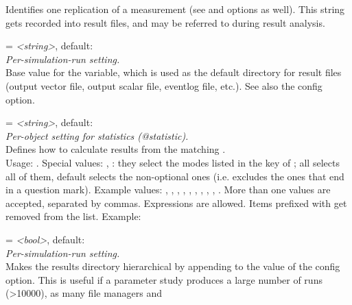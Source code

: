 \begin{description}
    Identifies one replication of a measurement (see  and
     options as well). This string gets
    recorded into result files, and may be referred to during result analysis.
\item[result-dir] = \textit{<string>}, default: \\
    \textit{Per-simulation-run setting.}\\
    Base value for the 
    variable, which is used as the default directory for result files (output
    vector file, output scalar file, eventlog file, etc.). See also the
     config option.
\item[**.result-recording-modes] = \textit{<string>}, default: \\
    \textit{Per-object setting for statistics (@statistic).}\\
    Defines how to calculate results from the matching
    .\\
    Usage:
    .
    Special values: , : they select the modes listed in
    the  key of ; all selects all of
    them, default selects the non-optional ones (i.e. excludes the ones that
    end in a question mark). Example values: , ,
    , , , , , ,
    , . More than one values are accepted, separated
    by commas. Expressions are allowed. Items prefixed with
    \ttt{-{\allowbreak}} get removed from the list. Example:
\item[resultdir-subdivision] = \textit{<bool>}, default: \\
    \textit{Per-simulation-run setting.}\\
    Makes the results directory hierarchical by appending
     to the value of the
     config option. This is useful if a parameter
    study produces a large number of runs (>10000), as many file managers and

\end{description}
